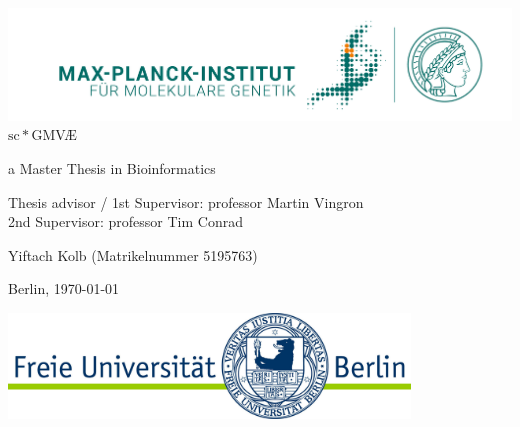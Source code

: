 \documentclass[11pt, a4paper]{report}
\theoremstyle{plain}
\theoremstyle{definition}
\theoremstyle{remark}
\begin{document}
\begin{titlepage}
\begin{center}
{\includegraphics[width=1.0\textwidth]{images/MPIMG_RGB_gruen.png}}\\
\vspace*{1cm}
\Large
$\mathrm{sc}\ast$GMV\AE



\large
a Master Thesis in Bioinformatics
\vspace{1.0cm}

Thesis advisor / 1st Supervisor: professor Martin Vingron\\
2nd Supervisor: professor Tim Conrad

\vfill

Yiftach Kolb (Matrikelnummer 5195763)

Berlin, \today

\vfill
{\includegraphics[width=0.8\textwidth]{images/fu-logo_bildschirm_RGB1.jpg}}
\end{center}
\end{titlepage}

\end{document}
